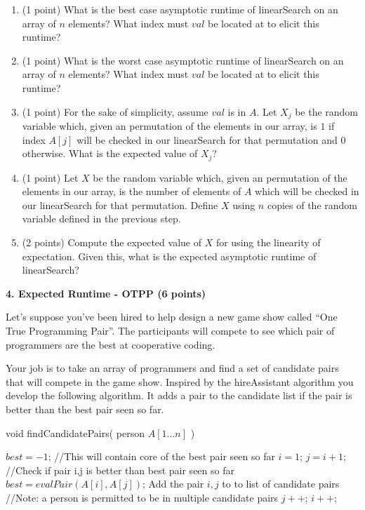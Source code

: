 \documentclass[12pt]{elsart}
\begin{document}
\begin{enumerate}
 \item (1 point) What is the best case asymptotic runtime of linearSearch on an array of $n$ elements?  What index must $val$ be located at to elicit this runtime?
 \item (1 point) What is the worst case asymptotic runtime of linearSearch on an array of $n$ elements?  What index must $val$ be located at to elicit this runtime?
 \item (1 point) For the sake of simplicity, assume $val$ is in $A$.  Let $X_j$ be the random variable which, given an permutation of the elements in our array, is $1$ if index $A[j]$ will be checked in our linearSearch for that permutation and $0$ otherwise.  What is the expected value of $X_j$?
 \item (1 point) Let $X$ be the random variable which, given an permutation of the elements in our array,  is the number of elements of $A$ which will be checked in our linearSearch for that permutation.  Define $X$ using $n$ copies of the random variable defined in the previous step.
 \item (2 points) Compute the expected value of $X$ for using the linearity of expectation. Given this, what is the expected asymptotic runtime of linearSearch?
\end{enumerate}

{\bf 4. Expected Runtime - OTPP (6 points)}

Let's suppose you've been hired to help design a new game show called ``One True Programming Pair''.  The participants will compete to see which pair of programmers are the best at cooperative coding.

Your job is to take an array of programmers and find a set of candidate pairs that will compete in the game show.  Inspired by the hireAssistant algorithm you develop the following algorithm.  It adds a pair to the candidate list if the pair is better than the best pair seen so far.  

\begin{algorithm}
\caption{void findCandidatePairs( person $A[1\ldots n]$ )}
 \begin{algorithmic}[1]
 \State $best = -1$;   //This will contain core of the best pair seen so far
 \State $i = 1$;
    \State $j = i+1$;
       \State //Check if pair i,j is better than best pair seen so far
          \State $best = evalPair(A[i],A[j])$;
          \State Add the pair $i,j$ to to list of candidate pairs 
          \State //Note: a person is permitted to be in multiple candidate pairs
       \EndIf
       \State $j++$;
    \EndWhile
    \State $i++$;
  \EndWhile
\end{algorithmic}
\end{algorithm}
\end{document}
